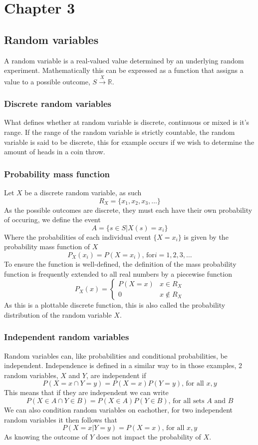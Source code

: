 \section{Chapter 3}
\subsection{Random variables}
\begin{definition}
    A random variable is a real-valued value determined by an underlying random experiment. Mathematically this can be expressed as a function that assigns a value to a possible outcome, $S\xrightarrow{X} \mathbb{R}$.
\end{definition}
\subsubsection{Discrete random variables}
What defines whether at random variable is discrete, continuous or mixed is it's range. If the range of the random variable is strictly countable, the random variable is said to be discrete, this for example occurs if we wish to determine the amount of heads in a coin throw.

\subsubsection{Probability mass function}
Let $X$ be a discrete random variable, as such
\[
    R_X=\{x_{1},x_{2},x_{3},\ldots\}
\]
As the possible outcomes are discrete, they must each have their own probability of occuring, we define the event
\[
    A=\{s\in S|X(s)=x_{i}\}
\]
Where the probabilities of each individual event $\{X=x_{i}\}$ is given by the probability mass function of $X$
\[
    P_{X}(x_{i})=P(X=x_{i})\text{, for} i=1,2,3,\ldots
\]
To ensure the function is well-defined, the definition of the mass probability function is frequently extended to all real numbers by a piecewise function
\[
    P_{X}(x)=\begin{cases}P(X=x) & x\in R_X \\ 0 & x\notin R_X\end{cases}
\]
As this is a plottable discrete function, this is also called the probability distribution of the random variable $X$.

\subsubsection{Independent random variables}
Random variables can, like probabilities and conditional probabilities, be independent. Independence is defined in a similar way to in those examples, 2 random variables, $X$ and $Y$, are independent if
\[
    P(X=x\cap Y=y)=P(X=x)P(Y=y) \text{, for all } x,y
\]
This means that if they are independent we can write
\[
    P(X\in A\cap Y\in B)=P(X\in A)P(Y\in B)\text{, for all sets } A \text{ and } B
\]
We can also condition random variables on eachother, for two independent random variables it then follows that
\[
    P(X=x|Y=y)=P(X=x)\text{, for all } x,y
\]
As knowing the outcome of $Y$ does not impact the probability of $X$.

